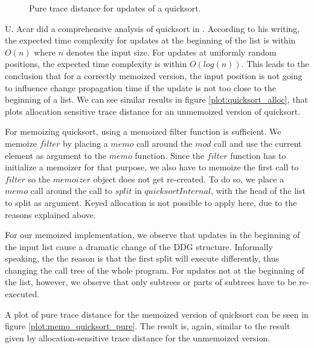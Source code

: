 \begin{figure}
\centering
{}
\caption{Pure trace distance for updates of a quicksort.}
\label{plot:quicksort_pure}
\end{figure}

U. Acar did a comprehensive analysis of quicksort in \cite{Acar2005thesis}. According to his writing, the expected time complexity for updates at the beginning of the list is within $O(n)$ where $n$ denotes the input size. For updates at uniformly random positions, the expected time complexity is within $O(log(n))$. This leads to the conclusion that for a correctly memoized version, the input position is not going to influence change propagation time if the update is not too close to the beginning of a list. We can see similar results in figure \ref{plot:quicksort_alloc}, that plots allocation sensitive trace distance for an unmemoized version of quicksort. 

For memoizing quicksort, using a memoized filter function is sufficient. We memoize $filter$ by placing a $memo$ call around the $mod$ call and use the current element as argument to the $memo$ function. Since the $filter$ function has to initialize a memoizer for that purpose, we also have to memoize the first call to $filter$ so the $memoizer$ object does not get re-created. To do so, we place a $memo$ call around the call to $split$ in $quicksortInternal$, with the head of the list to split as argument. Keyed allocation is not possible to apply here, due to the reasons explained above. 

For our memoized implementation, we observe that updates in the beginning of the input list cause a dramatic change of the DDG structure. Informally speaking, the the reason is that the first split will execute differently, thus changing the call tree of the whole program. For updates not at the beginning of the list, however, we observe that only subtrees or parts of subtrees have to be re-executed. 

A plot of pure trace distance for the memoized version of quicksort can be seen in figure \ref{plot:memo_quicksort_pure}. The result is, again, similar to the result given by allocation-sensitive trace distance for the unmemoized version. 

